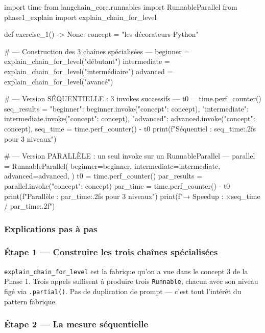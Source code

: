 \documentclass[11pt,a4paper]{article}
\begin{document}
\begin{pythoncode}
import time
from langchain_core.runnables import RunnableParallel
from phase1_explain import explain_chain_for_level


def exercise_1() -> None:
    concept = "les décorateurs Python"

    # --- Construction des 3 chaînes spécialisées ---
    beginner     = explain_chain_for_level("débutant")
    intermediate = explain_chain_for_level("intermédiaire")
    advanced     = explain_chain_for_level("avancé")

    # --- Version SÉQUENTIELLE : 3 invokes successifs ---
    t0 = time.perf_counter()
    seq_results = {
        "beginner":     beginner.invoke({"concept": concept}),
        "intermediate": intermediate.invoke({"concept": concept}),
        "advanced":     advanced.invoke({"concept": concept}),
    }
    seq_time = time.perf_counter() - t0
    print(f"Séquentiel : {seq_time:.2f}s pour 3 niveaux")

    # --- Version PARALLÈLE : un seul invoke sur un RunnableParallel ---
    parallel = RunnableParallel(
        beginner=beginner,
        intermediate=intermediate,
        advanced=advanced,
    )
    t0 = time.perf_counter()
    par_results = parallel.invoke({"concept": concept})
    par_time = time.perf_counter() - t0
    print(f"Parallèle  : {par_time:.2f}s pour 3 niveaux")
    print(f"→ Speedup  : ×{seq_time / par_time:.2f}")
\end{pythoncode}

\subsubsection{Explications pas à pas}

\subsubsection*{Étape 1 — Construire les trois chaînes spécialisées}

\texttt{explain\_chain\_for\_level} est la fabrique qu'on a vue dans le
concept 3 de la Phase 1. Trois appels suffisent à produire trois
\texttt{Runnable}, chacun avec son niveau figé via \texttt{.partial()}.
Pas de duplication de prompt — c'est tout l'intérêt du pattern fabrique.

\subsubsection*{Étape 2 — La mesure séquentielle}
\end{document}
